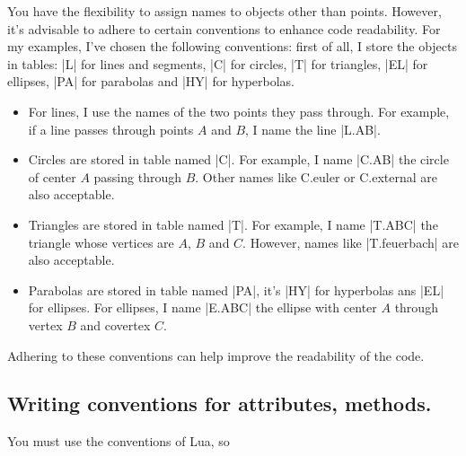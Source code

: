 You have the flexibility to assign names to objects other than points. However, it's advisable to adhere to certain conventions to enhance code readability. For my examples, I've chosen the following conventions: first of all, I store the objects in tables: |L| for lines and segments, |C| for circles, |T| for triangles, |EL| for ellipses, |PA| for parabolas and |HY| for hyperbolas.

\begin{itemize}
  \item 
  For lines, I use the names of the two points they pass through. For example, if a line passes through points  $A$ and $B$, I name the line |L.AB|. 

\item Circles are stored in table named |C|.
  For example, I name |C.AB| the circle of center $A$ passing through $B$. Other names like C.euler or C.external are also acceptable.

\item Triangles are stored in table named |T|.
  For example, I name |T.ABC| the triangle whose vertices are $A$, $B$ and $C$. However, names like |T.feuerbach| are also acceptable. 

\item Parabolas are stored in table named |PA|, it's |HY| for hyperbolas ans |EL| for ellipses.
  For ellipses, I name |E.ABC| the ellipse with center $A$ through vertex $B$ and covertex $C$.
\end{itemize}

Adhering to these conventions can help improve the readability of the code.


\subsection{Writing conventions for attributes, methods.} %
\label{sub:writing_conventions_for_attributes_methods_and_functions}

You must use the conventions of Lua, so

